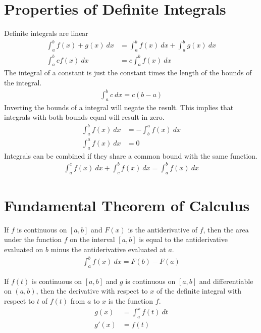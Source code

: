 \documentclass{article}
\theoremstyle{mytheoremstyle}
\theoremstyle{mytheoremstyle}
\theoremstyle{myproblemstyle}
\begin{document}
    \section*{Properties of Definite Integrals}
    Definite integrals are linear
    \begin{align*}
        \int_{a}^{b} f(x) + g(x) \ dx &= \int_{a}^{b} f(x) \ dx + \int_{a}^{b} g(x) \ dx \\
        \int_{a}^{b} cf(x) \ dx &= c \int_{a}^{b} f(x) \ dx
    \end{align*}
    The integral of a constant is just the constant times the length of the
    bounds of the integral.
    \begin{align*}
        \int_{a}^{b} c \ dx = c(b-a)
    \end{align*}
    Inverting the bounds of a integral will negate the result. This implies
    that integrals with both bounds equal will result in zero.
    \begin{align*}
        \int_{a}^{b} f(x) \ dx &= -\int_{b}^{a} f(x) \ dx \\
        \int_{a}^{a} f(x) \ dx &= 0
    \end{align*}
    Integrals can be combined if they share a common bound with the same
    function.
    \begin{align*}
        \int_{a}^{c} f(x) \ dx + \int_{c}^{b} f(x) \ dx = \int_{a}^{b} f(x) \ dx
    \end{align*}

    \section*{Fundamental Theorem of Calculus}
    If $f$ is continuous on $[a,b]$ and $F(x)$ is the antiderivative of $f$,
    then the area under the function $f$ on the interval $[a,b]$ is equal to the
    antiderivative evaluated on $b$ minus the antiderivative evaluated at $a$.
    \begin{align*}
        \int_{a}^{b} f(x) \ dx = F(b) - F(a)
    \end{align*}

    If $f(t)$ is continuous on $[a,b]$ and $g$ is continuous on $[a,b]$ and
    differentiable on $(a,b)$, then the derivative with respect to $x$ of the
    definite integral with respect to $t$ of $f(t)$ from $a$ to $x$ is the
    function $f$.
    \begin{align*}
        g(x) &= \int_{a}^{x} f(t) \ dt \\
        g'(x) &= f(t)
    \end{align*}
\end{document}
